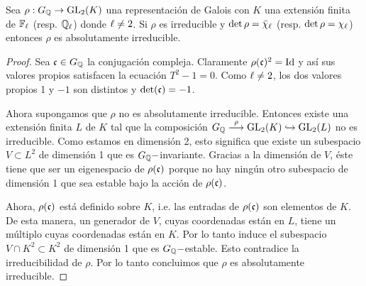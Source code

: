 \begin{prop}\label{prop:irred_equiv_absirred}
  Sea $\rho:G_{\mathbb{Q}}\rightarrow\mathrm{GL}_2(K)$ una representaci\'on de Galois con $K$ una extensi\'on finita de $\mathbb{F}_\ell$ (resp. $\mathbb{Q}_\ell$) donde $\ell\neq2$. Si $\rho$ es irreducible y $\det\rho=\bar{\chi}_\ell$ (resp. $\det\rho=\chi_\ell$) entonces $\rho$ es absolutamente irreducible.
\end{prop}
\begin{proof}
  Sea $\mathfrak{c}\in G_{\mathbb{Q}}$ la conjugaci\'on compleja. Claramente $\rho(\mathfrak{c})^2=\mathrm{Id}$ y as\'i sus valores propios satisfacen la ecuaci\'on $T^2-1=0$. Como $\ell\neq2$, los dos valores propios 1 y $-1$ son distintos y $\det(\mathfrak{c})=-1$.
  
  Ahora supongamos que $\rho$ no es absolutamente irreducible. Entonces existe una extensi\'on finita $L$ de $K$ tal que la composici\'on $G_{\mathbb{Q}}\overset{\rho}{\longrightarrow}\mathrm{GL}_2(K)\hookrightarrow\mathrm{GL}_2(L)$ no es irreducible. Como estamos en dimensi\'on 2, esto significa que existe un subespacio $V\subset L^2$ de dimensi\'on 1 que es $G_{\mathbb{Q}}-$invariante. Gracias a la dimensi\'on de $V$, \'este tiene que ser un eigenespacio de $\rho(\mathfrak{c})$ porque no hay ning\'un otro subespacio de dimensi\'on 1 que sea estable bajo la acci\'on de $\rho(\mathfrak{c})$.

  Ahora, $\rho(\mathfrak{c})$ est\'a definido sobre $K$, i.e. las entradas de $\rho(\mathfrak{c})$ son elementos de $K$. De esta manera, un generador de $V$, cuyas coordenadas est\'an en $L$, tiene un m\'ultiplo cuyas coordenadas est\'an en $K$. Por lo tanto induce el subespacio $V\cap K^2\subset K^2$ de dimensi\'on 1 que es $G_{\mathbb{Q}}-$estable. Esto contradice la irreducibilidad de $\rho$. Por lo tanto concluimos que $\rho$ es absolutamente irreducible.
\end{proof}

